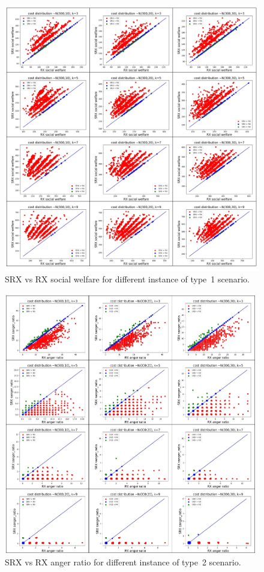 \documentclass[runningheads]{llncs}
\begin{document}
\begin{subappendices}
\begin{figure}[t]
\begin{center}
\includegraphics[width=14cm]{simulation/constant_scatters_no_prob.png}
\caption{SRX vs RX social welfare for different instance of type~1 scenario.
}\label{fig:scatter_all2}
\end{center}
\end{figure}

\begin{figure}[t]
\begin{center}
\includegraphics[width=14cm]{simulation/constant_scatters_ar.png}
\caption{SRX vs RX anger ratio for different instance of type~2 scenario.
}\label{fig:scatter_all_ar2}
\end{center}
\end{figure}


\end{subappendices}
\end{document}

